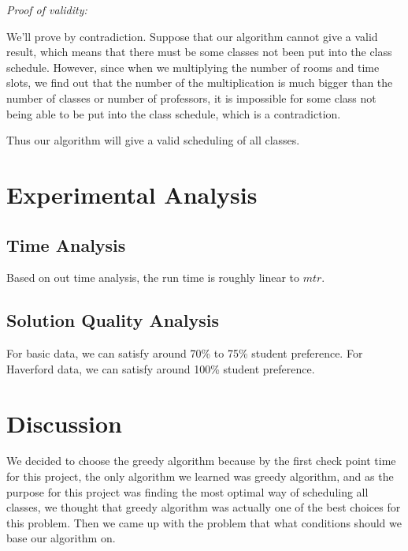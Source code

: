 \documentclass[11pt, oneside]{article}   	%
\begin{document}
\textit{Proof of validity:}

We'll prove by contradiction. Suppose that our algorithm cannot give a valid result, which means that there must be some classes not been put into the class schedule. However, since when we multiplying the number of rooms and time slots, we find out that the number of the multiplication is much bigger than the number of classes or number of professors, it is impossible for some class not being able to be put into the class schedule, which is a contradiction.

Thus our algorithm will give a valid scheduling of all classes.


\newpage
\section{Experimental Analysis}
\subsection{Time Analysis}
Based on out time analysis, the run time is roughly linear to $mtr$.

\subsection{Solution Quality Analysis}
For basic data, we can satisfy around 70\% to 75\% student preference. For Haverford data, we can satisfy around 100\% student preference. %



\newpage
\section{Discussion}

We decided to choose the greedy algorithm because by the first check point time for this project, the only algorithm we learned was greedy algorithm, and as the purpose for this project was finding the most optimal way of scheduling all classes, we thought that greedy algorithm was actually one of the best choices for this problem. Then we came up with the problem that what conditions should we base our algorithm on.
\end{document}
